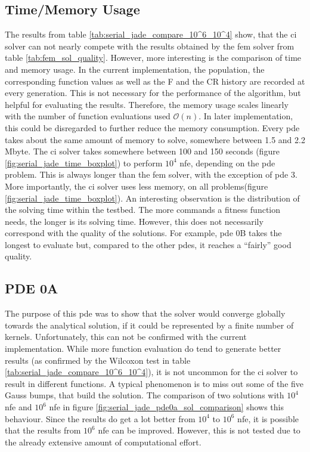 \documentclass[./\jobname.tex]{subfiles}
\begin{document}

\subsection{Time/Memory Usage}

The results from table \ref{tab:serial_jade_compare_10^6_10^4} show, that the \gls{ci} solver can not nearly compete with the results obtained by the \gls{fem} solver from table \ref{tab:fem_sol_quality}. 
However, more interesting is the comparison of time and memory usage. 
In the current implementation, the population, the corresponding function values as well as the F and the CR history are recorded at every generation. This is not necessary for the performance of the algorithm, but helpful for evaluating the results. Therefore, the memory usage scales linearly with the number of function evaluations used $\mathcal{O}(n)$. In later implementation, this could be disregarded to further reduce the memory consumption. Every \gls{pde} takes about the same amount of memory to solve, somewhere between 1.5 and 2.2 Mbyte. 
The \gls{ci} solver takes somewhere between 100 and 150 seconds (figure \ref{fig:serial_jade_time_boxplot}) to perform $10^4$ \gls{nfe}, depending on the \gls{pde} problem. This is always longer than the \gls{fem} solver, with the exception of \gls{pde} 3. More importantly, the \gls{ci} solver uses less memory, on all problems(figure \ref{fig:serial_jade_time_boxplot}). An interesting observation is the distribution of the solving time within the testbed. The more commands a fitness function needs, the longer is its solving time. However, this does not necessarily correspond with the quality of the solutions. For example, \gls{pde} 0B takes the longest to evaluate but, compared to the other \gls{pde}s, it reaches a ``fairly'' good quality. 



\subsection{PDE 0A}
\label{chap: experiment_0_pde_0A}

The purpose of this \gls{pde} was to show that the solver would converge globally towards the analytical solution, if it could be represented by a finite number of kernels. Unfortunately, this can not be confirmed with the current implementation. While more function evaluation do tend to generate better results (as confirmed by the Wilcoxon test in table \ref{tab:serial_jade_compare_10^6_10^4}), it is not uncommon for the \gls{ci} solver to result in different functions. A typical phenomenon is to miss out some of the five Gauss bumps, that build the solution. The comparison of two solutions with $10^4$ \gls{nfe} and $10^6$ \gls{nfe} in figure \ref{fig:serial_jade_pde0a_sol_comparison} shows this behaviour. Since the results do get a lot better from $10^4$ to $10^6$ \gls{nfe}, it is possible that the results from $10^6$ \gls{nfe} can be improved. However, this is not tested due to the already extensive amount of computational effort. 
\end{document}
